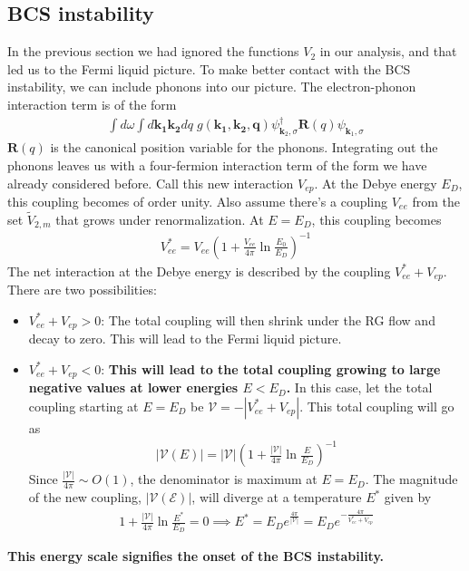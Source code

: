 \documentclass[14pt]{extarticle}
\begin{document}
\subsection{BCS instability}
In the previous section we had ignored the functions \(V_2\) in our analysis, and that led us to the Fermi liquid picture. To make better contact with the BCS instability, we can include phonons into our picture. The electron-phonon interaction term is of the form
\begin{equation}\begin{aligned}
\int d\omega \int d\mathbf{k_1}\mathbf{k_2}dq\;g(\mathbf{k_1},\mathbf{k_2},\mathbf{q})\psi_{\mathbf k_2,\sigma}^\dagger \mathbf{R}(q) \psi_{\mathbf k_1,\sigma}
\end{aligned}\end{equation}
\(\mathbf{R}(q)\) is the canonical position variable for the phonons. Integrating out the phonons leaves us with a four-fermion interaction term of the form we have already considered before. Call this new interaction \(V_{ep}\). At the Debye energy \(E_D\), this coupling becomes of order unity. Also assume there's a coupling \(V_{ee}\) from the set \(\tilde V_{2,m}\) that grows under renormalization. At \(E = E_D\), this coupling becomes
\begin{equation}\begin{aligned}
	V_{ee}^* = V_{ee}\left(1 + \frac{V_{ee}}{4\pi}\ln \frac{E_0}{E_D}\right)^{-1}
\end{aligned}\end{equation}
The net interaction at the Debye energy is described by the coupling \(V_{ee}^* + V_{ep}\). There are two possibilities:
\begin{itemize}
	\item \(V_{ee}^* + V_{ep} > 0\): The total coupling will then shrink under the RG flow and decay to zero. This will lead to the Fermi liquid picture.
	\item \(V_{ee}^* + V_{ep} < 0\): \textbf{This will lead to the total coupling growing to large negative values at lower energies \(E < E_D\).} In this case, let the total coupling starting at \(E = E_D\) be \(\mathcal{V} = -|V_{ee}^* + V_{ep}|\). This total coupling will go as
		\begin{equation}\begin{aligned}
			|\mathcal{V}(E)| = |\mathcal{V}|\left(1 + \frac{|\mathcal{V}|}{4\pi}\ln \frac{E}{E_D}\right)^{-1}
		\end{aligned}\end{equation}
		Since \(\frac{|\mathcal{V}|}{4\pi} \sim O(1)\), the denominator is maximum at \(E = E_D\). The magnitude of the new coupling, \(|\mathcal{V(E)}|\), will diverge at a temperature \(E^*\) given by
		\begin{equation}\begin{aligned}
		1 + \frac{|\mathcal{V}|}{4\pi}\ln \frac{E^*}{E_D} = 0 \implies E^* = E_D e^{\frac{4\pi}{|\mathcal{V}|}} = E_D e^{-\frac{4\pi}{V_{ee}^* + V_{ep}}}
		\end{aligned}\end{equation}
\end{itemize}
\textbf{This energy scale signifies the onset of the BCS instability.}
\end{document}
